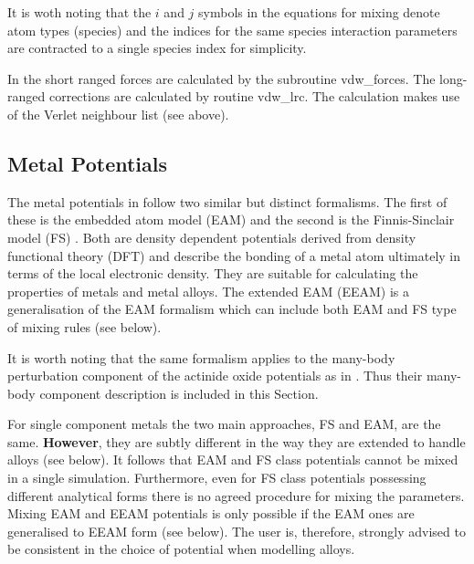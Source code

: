 It is woth noting that the $i$ and $j$ symbols in the equations
for mixing denote atom types (species) and the indices for the
same species interaction parameters are contracted to a single
species index for simplicity.

In \D the short ranged forces are calculated by the subroutine
{\sc vdw\_forces}.  The long-ranged corrections are calculated by
routine {\sc vdw\_lrc}.  The calculation makes use of the
Verlet neighbour list (see above).

\subsection{Metal Potentials}
\label{metal}

The metal potentials in \D follow two similar but distinct formalisms.
The first of these is the embedded atom model (EAM)
\cite{baskes-84a,baskes-86a} and the second is the Finnis-Sinclair
model (FS) \cite{finnis-84a}.  Both are density dependent potentials
derived from density functional theory (DFT) and describe the bonding
of a metal atom ultimately in terms of the local electronic density.
They are suitable for calculating the properties of metals
 and metal alloys.  The extended EAM (EEAM)
\cite{hepburn-08a,lau-07a} is a generalisation of the EAM formalism
which can include both EAM and FS type of mixing rules (see below).

It is worth noting that the same formalism applies to the many-body
perturbation component of the actinide oxide potentials as in
\cite{cooper-14a}.  Thus their many-body component description is
included in this Section.

For single component metals the two main approaches, FS and EAM, are the same.
{\bf However}, they are subtly different in the way they are extended to
handle alloys (see below).  It follows that EAM and FS class potentials
cannot be mixed in a single simulation.  Furthermore, even for FS
class potentials possessing different analytical forms there is no
agreed procedure for mixing the parameters.  Mixing EAM and EEAM
potentials is only possible if the EAM ones are generalised to EEAM
form (see below).  The user is, therefore, strongly advised to be
consistent in the choice of potential when modelling alloys.

